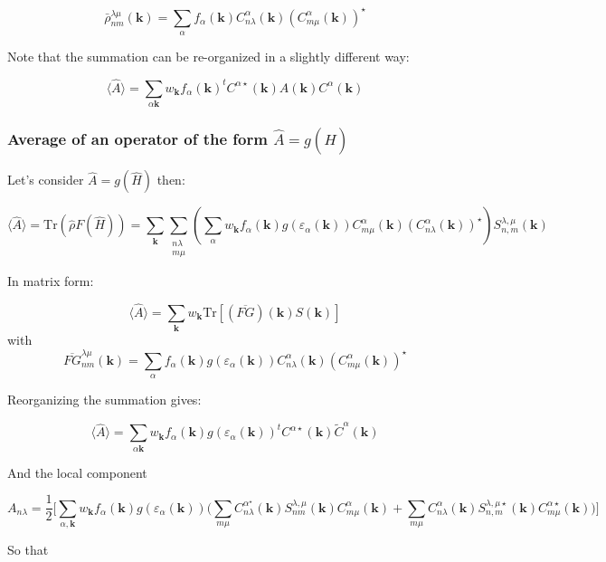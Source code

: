 \documentclass{article}
\newcommand{\op}[1]{\hat{#1}}
\begin{document}
\[ \bar{\rho}_{nm}^{\lambda \mu}(\mathbf{k})=  \sum_{\alpha}  f_{\alpha}(\mathbf{k})
C_{n \lambda}^{\alpha}(\mathbf{k})(C_{m \mu}^{\alpha}(\mathbf{k}))^{\star}    \]

\noindent
Note that the summation can be re-organized in a slightly different way:

\[\langle \op{A} \rangle =\sum_{\alpha \mathbf{k}} w_{\mathbf{k}} f_{\alpha}(\mathbf{k})
^tC^{\alpha \star}(\mathbf{k}) A(\mathbf{k}) C^{\alpha}(\mathbf{k}) \]


\subsubsection{Average of an operator of the form $\op{A}=g(\op{H})$}

\noindent
Let's consider $\op{A}=g(\op{H})$ then:


\[ \langle \op{A} \rangle =\mbox{Tr} (\op{\rho} F(\op{H}))= \sum_{\mathbf{k}}
\sum_{\substack{n \lambda\\ m \mu}}\left(
\sum_{\alpha} w_{\mathbf{k}}f_{\alpha}(\mathbf{k})g(\varepsilon_{\alpha}(\mathbf{k}))
 C_{m\mu}^{\alpha}(\mathbf{k}) (C_{n \lambda}^{\alpha}(\mathbf{k}))^{\star} \right)  S_{n,m}^{\lambda,\mu}(\mathbf{k})\]


\noindent
In matrix form:

\[\langle \op{A} \rangle = \sum_{\mathbf{k}} w_{\mathbf{k}}\mbox{Tr} 
 \left[(\overline{FG})(\mathbf{k}) S(\mathbf{k}) \right] \] 
\noindent
with
\[ \overline{FG}_{n m}^{\lambda \mu}(\mathbf{k})=  \sum_{\alpha} f_{\alpha}(\mathbf{k})
g(\varepsilon_{\alpha}(\mathbf{k}))C_{n \lambda}^{\alpha}(\mathbf{k})(C_{m \mu}^{\alpha}(\mathbf{k}))^{\star}    \]

\noindent
Reorganizing the summation gives:

\[\langle \op{A} \rangle=
\sum_{\alpha \mathbf{k}} w_{\mathbf{k}}
f_{\alpha}(\mathbf{k})g(\varepsilon_{\alpha}(\mathbf{k})) 
^tC^{\alpha \star}(\mathbf{k})\widetilde{C}^{\alpha}(\mathbf{k}) \]

\noindent
And the local component

\[ A_{n \lambda}=\frac{1}{2}\Bigg[\sum_{\alpha,\mathbf{k}} w_{\mathbf{k}}
f_{\alpha}(\mathbf{k})g(\varepsilon_{\alpha}(\mathbf{k})) 
\Bigg(\sum_{m \mu} C_{n \lambda}^{\alpha ^{\star}}(\mathbf{k})S_{nm}^{\lambda,\mu}(\mathbf{k})C_{m \mu}^{\alpha}(\mathbf{k}) + \sum_{m
\mu} C_{n \lambda}^{\alpha}(\mathbf{k})S_{n,m}^{\lambda,\mu
\star}(\mathbf{k})C_{m \mu}^{\alpha \star}(\mathbf{k})\Bigg) \Bigg]\]

\noindent
So that
\end{document}
